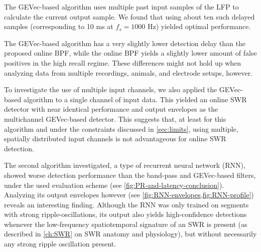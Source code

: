 The GEVec-based algorithm uses multiple past input samples of the LFP to calculate the current output sample. We found that using about ten such delayed samples (corresponding to 10 ms at $f_s = 1000$ Hz) yielded optimal performance.

The GEVec-based algorithm has a very slightly lower detection delay than the proposed online BPF, while the online BPF yields a slightly lower amount of false positives in the high recall regime. These differences might not hold up when analyzing data from multiple recordings, animals, and electrode setups, however.

To investigate the use of multiple input channels, we also applied the GEVec-based algorithm to a single channel of input data. This yielded an online SWR detector with near identical performance and output envelopes as the multichannel GEVec-based detector. This suggests that, at least for this algorithm and under the constraints discussed in \cref{sec:limits}, using multiple, spatially distributed input channels is not advantageous for online SWR detection.

The second algorithm investigated, a type of recurrent neural network (RNN), showed worse detection performance than the band-pass and GEVec-based filters, under the used evaluation scheme (see \cref{fig:PR-and-latency-conclusion}). Analyzing its output envelopes however (see \cref{fig:RNN-envelopes,fig:RNN-profile}) reveals an interesting finding. Although the RNN was only trained on segments with strong ripple-oscillations, its output also yields high-confidence detections whenever the low-frequency spatiotemporal signature of an SWR is present (as described in \cref{ch:SWR} on SWR anatomy and physiology), but without necessarily any strong ripple oscillation present.

